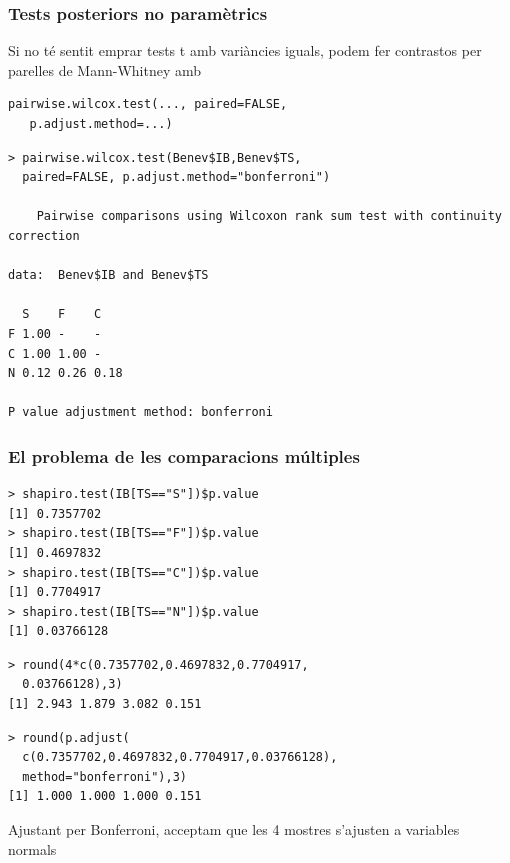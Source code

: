 \documentclass[12pt,t]{beamer}
\theoremstyle{plain}
\theoremstyle{definition}
\begin{document}
\begin{frame}[fragile]
\frametitle{Tests posteriors no paramètrics}\vspace*{-1ex}

Si no té sentit emprar tests t amb variàncies iguals, podem fer contrastos per parelles de Mann-Whitney amb
\begin{lstlisting}
pairwise.wilcox.test(..., paired=FALSE,
   p.adjust.method=...)
\end{lstlisting}\pause

\begin{lstlisting}
> pairwise.wilcox.test(Benev$IB,Benev$TS,
  paired=FALSE, p.adjust.method="bonferroni")

	Pairwise comparisons using Wilcoxon rank sum test with continuity correction 

data:  Benev$IB and Benev$TS 

  S    F    C   
F 1.00 -    -   
C 1.00 1.00 -   
N 0.12 0.26 0.18

P value adjustment method: bonferroni
\end{lstlisting}

\end{frame}

\begin{frame}[fragile]
\frametitle{El problema de les comparacions múltiples}\vspace*{-2ex}
\begin{lstlisting}
> shapiro.test(IB[TS=="S"])$p.value
[1] 0.7357702
> shapiro.test(IB[TS=="F"])$p.value
[1] 0.4697832
> shapiro.test(IB[TS=="C"])$p.value
[1] 0.7704917
> shapiro.test(IB[TS=="N"])$p.value
[1] 0.03766128
\end{lstlisting}\pause\vspace*{-1.75ex}
\begin{lstlisting}
> round(4*c(0.7357702,0.4697832,0.7704917,
  0.03766128),3)
[1] 2.943 1.879 3.082 0.151
\end{lstlisting}
\pause\vspace*{-1.75ex}
\begin{lstlisting}
> round(p.adjust(
  c(0.7357702,0.4697832,0.7704917,0.03766128),
  method="bonferroni"),3)
[1] 1.000 1.000 1.000 0.151
\end{lstlisting}

Ajustant per Bonferroni, acceptam que les 4 mostres s'ajusten a variables normals

\end{frame}
\end{document}
